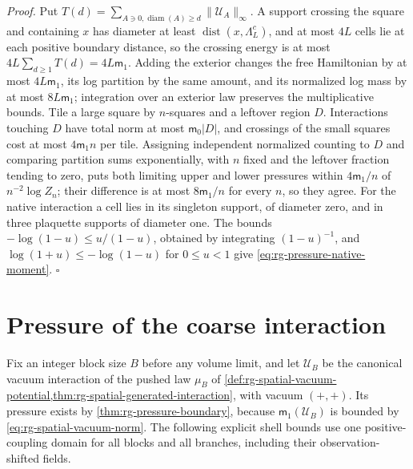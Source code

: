 \noindent\emph{Proof.}
Put $T(d)=\sum_{A\ni0,\operatorname{diam}(A)\geq d}\|\mathscr U_A\|_\infty$. A
support crossing the square and containing $x$ has diameter at least
$\operatorname{dist}(x,\Lambda_L^c)$, and at most $4L$ cells lie at each
positive boundary distance, so the crossing energy is at most
$4L\sum_{d\geq1}T(d)=4L\mathsf m_1$. Adding the exterior changes the free
Hamiltonian by at most $4L\mathsf m_1$, its log partition by the same amount,
and its normalized log mass by at most $8L\mathsf m_1$; integration over an
exterior law preserves the multiplicative bounds. Tile a large square by
$n$-squares and a leftover region $D$. Interactions touching $D$ have total
norm at most $\mathsf m_0|D|$, and crossings of the small squares cost at most
$4\mathsf m_1n$ per tile. Assigning independent normalized counting to $D$
and comparing partition sums exponentially, with $n$ fixed and the leftover
fraction tending to zero, puts both limiting upper and lower pressures within
$4\mathsf m_1/n$ of $n^{-2}\log Z_n$; their difference is at most
$8\mathsf m_1/n$ for every $n$, so they agree. For the native interaction a
cell lies in its singleton support, of diameter zero, and in three plaquette
supports of diameter one. The bounds $-\log(1-u)\leq u/(1-u)$, obtained by
integrating $(1-u)^{-1}$, and $\log(1+u)\leq-\log(1-u)$ for $0\leq u<1$ give
\cref{eq:rg-pressure-native-moment}. $\square$

\section{Pressure of the coarse interaction}
\label{sec:rg-pressure-coarse}

Fix an integer block size $B$ before any volume limit, and let $\mathscr U_B$ be
the canonical vacuum interaction of the pushed law $\mu_B$ of
\cref{def:rg-spatial-vacuum-potential,thm:rg-spatial-generated-interaction},
with vacuum $(+,+)$. Its pressure exists by \cref{thm:rg-pressure-boundary},
because $\mathsf m_1(\mathscr U_B)$ is bounded by \cref{eq:rg-spatial-vacuum-norm}.
The following explicit shell bounds use one positive-coupling domain for all
blocks and all branches, including their observation-shifted fields.

